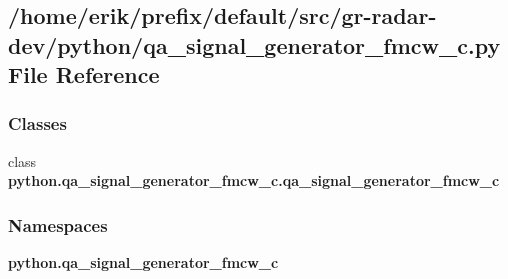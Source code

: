 \subsection{/home/erik/prefix/default/src/gr-\/radar-\/dev/python/qa\+\_\+signal\+\_\+generator\+\_\+fmcw\+\_\+c.py File Reference}
\label{qa__signal__generator__fmcw__c_8py}
\subsubsection*{Classes}
\begin{DoxyCompactItemize}
\item 
class {\bf python.\+qa\+\_\+signal\+\_\+generator\+\_\+fmcw\+\_\+c.\+qa\+\_\+signal\+\_\+generator\+\_\+fmcw\+\_\+c}
\end{DoxyCompactItemize}
\subsubsection*{Namespaces}
\begin{DoxyCompactItemize}
\item 
 {\bf python.\+qa\+\_\+signal\+\_\+generator\+\_\+fmcw\+\_\+c}
\end{DoxyCompactItemize}

